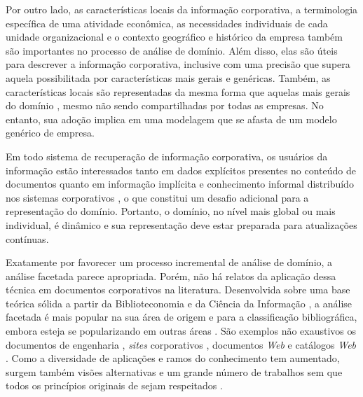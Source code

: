 Por outro lado, as características locais da informação corporativa, a terminologia específica de uma atividade econômica, as necessidades individuais de cada unidade organizacional e o contexto geográfico e histórico da empresa também são importantes no processo de análise de domínio. Além disso, elas são úteis para descrever a informação corporativa, inclusive com uma precisão que supera aquela possibilitada por características mais gerais e genéricas. Também, as características locais são representadas da mesma forma que aquelas mais gerais do domínio \cite{dolby09extractingVocabularies,giess2008generation,wild2009describing}, mesmo não sendo compartilhadas por todas as empresas. No entanto, sua adoção implica em uma modelagem que se afasta de um modelo genérico de empresa.

Em todo sistema de recuperação de informação corporativa, os usuários da informação estão interessados tanto em dados explícitos presentes no conteúdo de documentos \cite{gardin1973} quanto em informação implícita e conhecimento informal distribuído nos sistemas corporativos \cite{dealwis2001singapore,choo2008,marcella2012,nunes2006,ofarrill2010}, o que constitui um desafio adicional para a representação do domínio. Portanto, o domínio, no nível mais global ou mais individual, é dinâmico e sua representação deve estar preparada para atualizações contínuas.

Exatamente por favorecer um processo incremental de análise de domínio, a análise facetada parece apropriada. Porém, não há relatos da aplicação dessa técnica em documentos corporativos na literatura. Desenvolvida sobre uma base teórica sólida a partir da Biblioteconomia e da Ciência da Informação \cite{garfield1984}, a análise facetada é mais popular na sua área de origem e para a classificação bibliográfica, embora esteja se popularizando em outras áreas \cite{labarre2010}. São exemplos não exaustivos os documentos de engenharia \cite{giess2008generation,wild2009describing}, \textit{sites} corporativos \cite{wang2008using}, documentos \textit{Web} \cite{hong06,vickery2008faceted} e catálogos \textit{Web} \cite{sacco2006}. Como a diversidade de aplicações e ramos do conhecimento tem aumentado, surgem também visões alternativas e um grande número de trabalhos sem que todos os princípios originais de  sejam respeitados \cite{spiteri98simplified,wild2009describing}.

